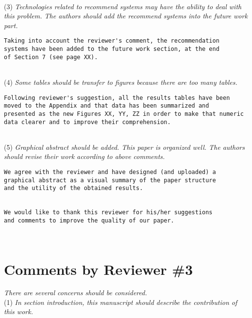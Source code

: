 \documentclass[preprint]{elsarticle}
\begin{document}
~\\
\noindent (3) \emph{Technologies related to recommend systems may have the ability to deal with this problem. The authors should add the recommend systems into the future work part. } 

\begin{verbatim}
Taking into account the reviewer's comment, the recommendation 
systems have been added to the future work section, at the end 
of Section 7 (see page XX).
\end{verbatim}

~\\
\noindent (4) \emph{Some tables should be transfer to figures because there are too many tables. } 

\begin{verbatim}
Following reviewer's suggestion, all the results tables have been 
moved to the Appendix and that data has been summarized and 
presented as the new Figures XX, YY, ZZ in order to make that numeric 
data clearer and to improve their comprehension.
\end{verbatim}

~\\
\noindent (5) \emph{Graphical abstract should be added. This paper is organized well. The authors should revise their work according to above comments. } 

\begin{verbatim}
We agree with the reviewer and have designed (and uploaded) a 
graphical abstract as a visual summary of the paper structure 
and the utility of the obtained results.


We would like to thank this reviewer for his/her suggestions 
and comments to improve the quality of our paper.
\end{verbatim}

~\\


\section{Comments by Reviewer \#3}

\noindent \emph{There are several concerns should be considered.}\\

\noindent (1) \emph{In section introduction, this manuscript should describe the contribution of this work. } 
\end{document}
